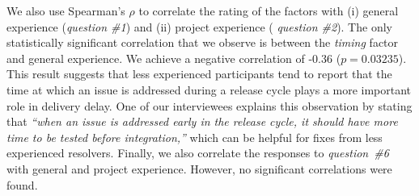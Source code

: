 \begin{sloppypar}
We also use Spearman's $\rho$ to correlate the rating of the factors with (i)
general experience ({\em question \#1}) and (ii) project experience ({\em
question \#2}). The only statistically significant correlation that we observe is
between the {\em timing} factor and general experience. We achieve a negative
correlation of -0.36 ($p=0.03235$). This result suggests that less
experienced participants tend to report that the time at which an issue is
addressed during a release cycle plays a more important role in delivery
delay. One of our interviewees explains this observation by stating that {\em
``when an issue is addressed early in the release cycle, it should have more
time to be tested before integration,''} which can be helpful for fixes
from less experienced resolvers. Finally, we also correlate the responses
to {\em question~\#6} with general and project experience. However, no
significant correlations were found.\\
\end{sloppypar}


